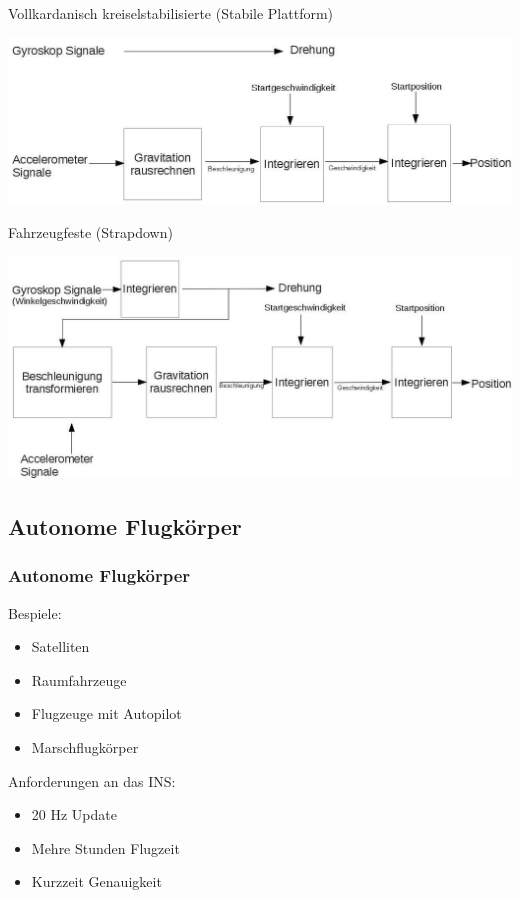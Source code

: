 \documentclass[10pt,a4paper,oneside]{beamer}
\begin{document}
\begin{frame}
	Vollkardanisch kreiselstabilisierte (Stabile Plattform)

	\includegraphics[width=\textwidth, height=0.4\textheight,keepaspectratio=true]{images/stable.jpg} 

	\bigskip
	Fahrzeugfeste (Strapdown)

		\includegraphics[width=\textwidth, height=0.4\textheight,keepaspectratio=true]{images/strap.jpg} 


\end{frame}

\begin{frame}
	\section{Autonome Flugkörper}
	\frametitle{Autonome Flugkörper}
	Bespiele: 
	
	\begin{itemize}
		\item Satelliten
		\item Raumfahrzeuge
		\item Flugzeuge mit Autopilot
		\item Marschflugkörper
	\end{itemize}
	
	Anforderungen an das INS:\\
	\begin{itemize}
		\item 20 Hz Update
		\item Mehre Stunden Flugzeit
		\item Kurzzeit Genauigkeit
	\end{itemize}
	
\end{frame}
\end{document}
